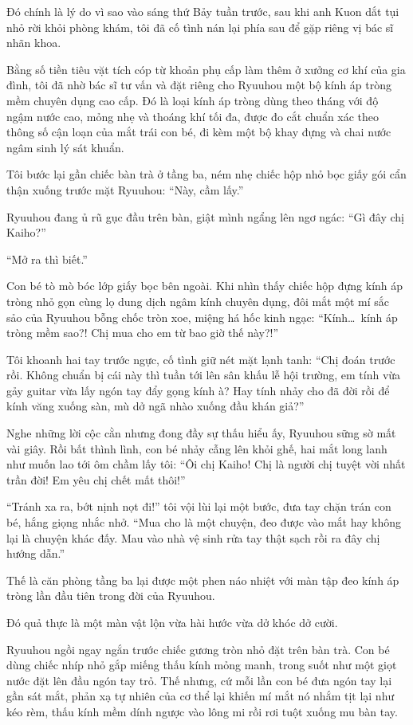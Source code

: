 \documentclass[../main.tex]{subfiles}
\begin{document}
Đó chính là lý do vì sao vào sáng thứ Bảy tuần trước, sau khi anh Kuon dắt tụi nhỏ rời khỏi phòng khám, tôi đã cố tình nán lại phía sau để gặp riêng vị bác sĩ nhãn khoa.

Bằng số tiền tiêu vặt tích cóp từ khoản phụ cấp làm thêm ở xưởng cơ khí của gia đình, tôi đã nhờ bác sĩ tư vấn và đặt riêng cho Ryuuhou một bộ kính áp tròng mềm chuyên dụng cao cấp. Đó là loại kính áp tròng dùng theo tháng với độ ngậm nước cao, mỏng nhẹ và thoáng khí tối đa, được đo cắt chuẩn xác theo thông số cận loạn của mắt trái con bé, đi kèm một bộ khay đựng và chai nước ngâm sinh lý sát khuẩn.

Tôi bước lại gần chiếc bàn trà ở tầng ba, ném nhẹ chiếc hộp nhỏ bọc giấy gói cẩn thận xuống trước mặt Ryuuhou: ``Này, cầm lấy.''

Ryuuhou đang ủ rũ gục đầu trên bàn, giật mình ngẩng lên ngơ ngác: ``Gì đây chị Kaiho?''

``Mở ra thì biết.''

Con bé tò mò bóc lớp giấy bọc bên ngoài. Khi nhìn thấy chiếc hộp đựng kính áp tròng nhỏ gọn cùng lọ dung dịch ngâm kính chuyên dụng, đôi mắt một mí sắc sảo của Ryuuhou bỗng chốc tròn xoe, miệng há hốc kinh ngạc: ``Kính\dots\ kính áp tròng mềm sao?! Chị mua cho em từ bao giờ thế này?!''

Tôi khoanh hai tay trước ngực, cố tình giữ nét mặt lạnh tanh: ``Chị đoán trước rồi. Không chuẩn bị cái này thì tuần tới lên sân khấu lễ hội trường, em tính vừa gảy guitar vừa lấy ngón tay đẩy gọng kính à? Hay tính nhảy cho đã đời rồi để kính văng xuống sàn, mù dở ngã nhào xuống đầu khán giả?''

Nghe những lời cộc cằn nhưng đong đầy sự thấu hiểu ấy, Ryuuhou sững sờ mất vài giây. Rồi bất thình lình, con bé nhảy cẫng lên khỏi ghế, hai mắt long lanh như muốn lao tới ôm chầm lấy tôi: ``Ôi chị Kaiho! Chị là người chị tuyệt vời nhất trần đời! Em yêu chị chết mất thôi!''

``Tránh xa ra, bớt nịnh nọt đi!'' tôi vội lùi lại một bước, đưa tay chặn trán con bé, hắng giọng nhắc nhở. ``Mua cho là một chuyện, đeo được vào mắt hay không lại là chuyện khác đấy. Mau vào nhà vệ sinh rửa tay thật sạch rồi ra đây chị hướng dẫn.''

Thế là căn phòng tầng ba lại được một phen náo nhiệt với màn tập đeo kính áp tròng lần đầu tiên trong đời của Ryuuhou.

Đó quả thực là một màn vật lộn vừa hài hước vừa dở khóc dở cười.

Ryuuhou ngồi ngay ngắn trước chiếc gương tròn nhỏ đặt trên bàn trà. Con bé dùng chiếc nhíp nhỏ gắp miếng thấu kính mỏng manh, trong suốt như một giọt nước đặt lên đầu ngón tay trỏ. Thế nhưng, cứ mỗi lần con bé đưa ngón tay lại gần sát mắt, phản xạ tự nhiên của cơ thể lại khiến mí mắt nó nhắm tịt lại như kéo rèm, thấu kính mềm dính ngược vào lông mi rồi rơi tuột xuống mu bàn tay.
\end{document}
